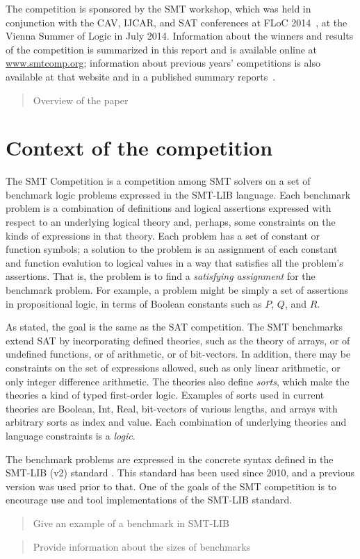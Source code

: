 \documentclass[twosize,11pt]{article}
\newcommand{\comment}[2]{\begin{quote}\sc #1\marginpar{\textcolor{red}{$\ast^{\mbox{#2}}$}}\end{quote}}
\newcommand{\tjark}[1]{\comment{#1}{TW}}
\newcommand{\davidd}[1]{\comment{#1}{DD}}
\begin{document}
The competition is sponsored by the SMT workshop, which was held in conjunction with the
CAV, IJCAR, and SAT conferences at FLoC 2014~\cite{FLoC2014}, at the Vienna Summer of Logic\cite{VSL} in July 2014.
Information about the winners
and results of the competition is summarized in this report and is available online at \url{www.smtcomp.org}; information
about previous years' competitions is also available at that website and in a published summary reports~\cite{springerlink:10.1007/s10817-012-9246-5,DBLP:conf/cade/CokGBD12,it:2014-017}.%

\davidd{Overview of the paper}

\section{Context of the competition}
\label{sec:context}

The SMT Competition is a competition among SMT solvers on a set of benchmark logic problems expressed in the SMT-LIB \cite{TBD} language. Each benchmark problem is a combination of definitions and logical assertions expressed with respect to an underlying logical theory and, perhaps, some constraints on the kinds of expressions in that theory. Each problem has a set of constant or function symbols; a solution to the problem is an assignment of each constant and function evalution to logical values in a way that satisfies all the problem's assertions. That is, the problem is to find a \textit{satisfying assignment} for the benchmark problem. For example, a problem might be simply a set of assertions in 
propositional logic, in terms of Boolean constants such as $P$, $Q$, and $R$.

As stated, the goal is the same as the SAT competition. The SMT benchmarks extend SAT by incorporating defined theories, such as the theory of arrays, or of undefined functions, or of arithmetic, or of bit-vectors. In addition, there may be constraints on the set of expressions allowed, such as only linear arithmetic, or only integer difference arithmetic. The theories also define \textit{sorts}, which make the theories a kind of typed first-order logic. Examples of sorts used in current theories are Boolean, Int, Real, bit-vectors of various lengths, and arrays with arbitrary sorts as index and value. Each combination of underlying theories and language constraints is a \textit{logic}.

The benchmark problems are expressed in the concrete syntax defined in the SMT-LIB (v2) standard \cite{TBD}. This standard has been used since 2010, and a previous version was used prior to that. One of the goals of the SMT competition is to encourage use and tool implementations of the SMT-LIB standard.
\tjark{Give an example of a benchmark in SMT-LIB} \tjark{Provide information about the sizes of benchmarks}
\end{document}
